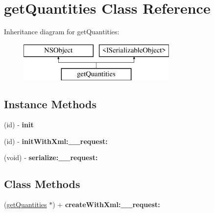 \hypertarget{interfaceget_quantities}{}\section{get\+Quantities Class Reference}
\label{interfaceget_quantities}
Inheritance diagram for get\+Quantities\+:\begin{figure}[H]
\begin{center}
\leavevmode
\includegraphics[height=2.000000cm]{interfaceget_quantities}
\end{center}
\end{figure}
\subsection*{Instance Methods}
\begin{DoxyCompactItemize}
\item 
\hypertarget{interfaceget_quantities_a37494084189559265fb0369cbb035188}{}(id) -\/ {\bfseries init}\label{interfaceget_quantities_a37494084189559265fb0369cbb035188}

\item 
\hypertarget{interfaceget_quantities_a2091ed3b2e26a9f537e83a9dd4da0418}{}(id) -\/ {\bfseries init\+With\+Xml\+:\+\_\+\+\_\+request\+:}\label{interfaceget_quantities_a2091ed3b2e26a9f537e83a9dd4da0418}

\item 
\hypertarget{interfaceget_quantities_a4bd73557be4c0f81a1ad2a0eff1e7fd4}{}(void) -\/ {\bfseries serialize\+:\+\_\+\+\_\+request\+:}\label{interfaceget_quantities_a4bd73557be4c0f81a1ad2a0eff1e7fd4}

\end{DoxyCompactItemize}
\subsection*{Class Methods}
\begin{DoxyCompactItemize}
\item 
\hypertarget{interfaceget_quantities_a326e2acd0d7dcfb215701992782518e4}{}(\hyperlink{interfaceget_quantities}{get\+Quantities} $\ast$) + {\bfseries create\+With\+Xml\+:\+\_\+\+\_\+request\+:}\label{interfaceget_quantities_a326e2acd0d7dcfb215701992782518e4}

\end{DoxyCompactItemize}
